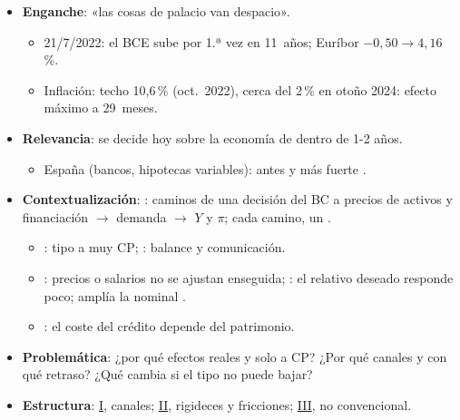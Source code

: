 \documentclass{article}
\begin{document}
\cabecerarepaso
\begin{columnas}

\begin{itemize}
\item \textbf{Enganche}: «las cosas de palacio van despacio».
  \begin{itemize}
  \item 21/7/2022: el BCE sube por 1.ª vez en 11~años; Euríbor $-0{,}50\to4{,}16$\,\%.
  \item Inflación: techo 10,6\,\% (oct.\ 2022), cerca del 2\,\% en otoño 2024: efecto máximo a 29~meses.
  \end{itemize}
\item \textbf{Relevancia}: se decide hoy sobre la economía de dentro de 1-2 años.
  \begin{itemize}
  \item España (bancos, hipotecas variables): antes y más fuerte .
  \end{itemize}
\item \textbf{Contextualización}: : caminos de una decisión del BC a precios de activos y financiación $\to$ demanda $\to$ $Y$ y $\pi$; cada camino, un .
  \begin{itemize}
  \item {}: tipo a muy CP; : balance y comunicación.
  \item {}: precios o salarios no se ajustan enseguida; : el relativo deseado responde poco; amplía la nominal .
  \item {}: el coste del crédito depende del patrimonio.
  \end{itemize}
\item \textbf{Problemática}: ¿por qué efectos reales y solo a CP? ¿Por qué canales y con qué retraso? ¿Qué cambia si el tipo no puede bajar?
\item \textbf{Estructura}: \hyperref[rep:I]{I}, canales; \hyperref[rep:II]{II}, rigideces y fricciones; \hyperref[rep:III]{III}, no convencional.
\end{itemize}


\end{columnas}
\end{document}
